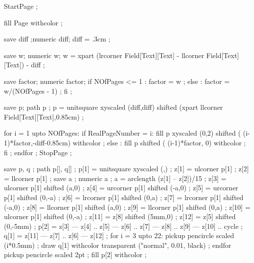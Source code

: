 

StartPage ;

fill Page withcolor  ;

save diff ;numeric diff;
diff = .3cm ;

save w; numeric w;
w = xpart (lrcorner Field[Text][Text] - llcorner Field[Text][Text]) - diff ;

save factor; numeric factor;
if NOfPages <= 1 :
  factor = w ;
else :
  factor = w/(NOfPages - 1) ;
fi ;

save p; path p ;
p = unitsquare xyscaled (diff,diff)
               shifted (xpart llcorner Field[Text][Text],0.85cm) ;

for i = 1 upto NOfPages:
  if RealPageNumber = i:
    fill p xyscaled (0,2) shifted ( (i-1)*factor,-diff-0.85cm)
         withcolor  ;
  else :
    fill p shifted ( (i-1)*factor, 0)
         withcolor  ;
  fi ;
endfor ;
StopPage ;
\stopuseMPgraphic





\setupTitle
  [color=simpleslides:contrastcolor]


\setupSlideTitle
  [\c!color={simpleslides:contrastcolor},
   \c!alternative=layer,
   \c!align=\v!center,
   \c!width=\textwidth,
   \c!height=3cm,
   \c!after=]


save p, q ; path p[], q[] ;
p[1] = unitsquare xyscaled (\overlaywidth,\overlayheight) ;
z[1] = ulcorner p[1] ;
z[2] = llcorner p[1] ;
save a ; numeric a ;
a = arclength (z[1] -- z[2])/15 ;
z[3] = ulcorner p[1] shifted (a,0) ;
z[4] = urcorner p[1] shifted (-a,0) ;
z[5] = urcorner p[1] shifted (0,-a) ;
z[6] = lrcorner p[1] shifted (0,a) ;
z[7] = lrcorner p[1] shifted (-a,0) ;
z[8] = llcorner p[1] shifted (a,0) ;
z[9] = llcorner p[1] shifted (0,a) ;
z[10] = ulcorner p[1] shifted (0,-a) ;
z[11] = z[8] shifted (5mm,0) ;
z[12] = z[5] shifted (0,-5mm) ;
p[2] = z[3] --- z[4] .. z[5] --- z[6]  .. z[7] --- z[8] .. z[9] --- z[10] .. cycle ;
q[1] = z[11] --- z[7] .. z[6] --- z[12] ;
for i = 3 upto 22:
	pickup pencircle scaled (i*0.5mm) ;
	draw q[1] withcolor transparent ("normal", 0.01, black) ;
endfor
pickup pencircle scaled 2pt ;
fill p[2] withcolor  ;
\stopuniqueMPgraphic

